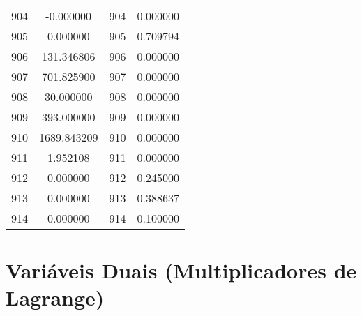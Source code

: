 \documentclass[12pt]{article}
\begin{document}
\begin{longtable}{@{}cccc@{}}
904 & -0.000000 & 904 & 0.000000 \\
905 & 0.000000 & 905 & 0.709794 \\
906 & 131.346806 & 906 & 0.000000 \\
907 & 701.825900 & 907 & 0.000000 \\
908 & 30.000000 & 908 & 0.000000 \\
909 & 393.000000 & 909 & 0.000000 \\
910 & 1689.843209 & 910 & 0.000000 \\
911 & 1.952108 & 911 & 0.000000 \\
912 & 0.000000 & 912 & 0.245000 \\
913 & 0.000000 & 913 & 0.388637 \\
914 & 0.000000 & 914 & 0.100000 \\

\end{longtable}

\section{Variáveis Duais (Multiplicadores de Lagrange)}
\end{document}
